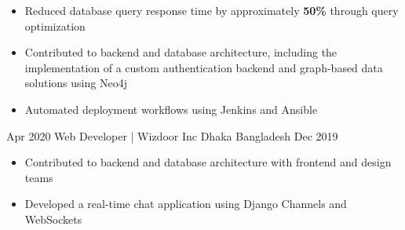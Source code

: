 \begin{experiences}
{\begin{itemize}
                \item Reduced database query response time by approximately
                      \textbf{50\%} through query optimization

                \item Contributed to backend and database architecture, including
                      the implementation of a custom authentication backend and
                      graph-based data solutions using Neo4j

                \item Automated deployment workflows using Jenkins and Ansible
            \end{itemize}
        }
        {}

    \emptySeparator

    \experience
        {Apr 2020}
        {Web Developer | Wizdoor Inc}
        {Dhaka}
        {Bangladesh}
        {Dec 2019}
        {
            \begin{itemize}
                \item Contributed to backend and database architecture with frontend and design teams

                \item Developed a real-time chat application using Django Channels
                      and WebSockets
            \end{itemize}
        }
        {}

\end{experiences}

